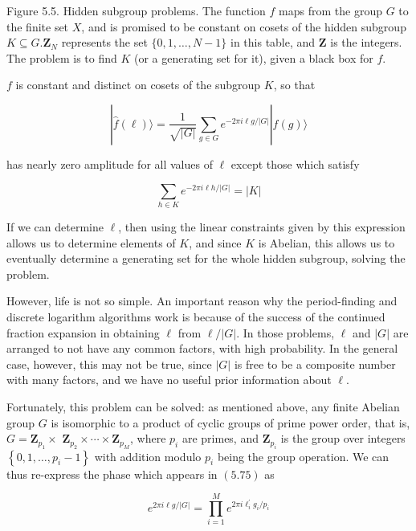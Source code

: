 Figure 5.5. Hidden subgroup problems. The function $f$ maps from the group $G$ to the finite set $X$, and is promised to be constant on cosets of the hidden subgroup $K \subseteq G . \mathbf{Z}_{N}$ represents the set $\{0,1, \ldots, N-1\}$ in this table, and $\mathbf{Z}$ is the integers. The problem is to find $K$ (or a generating set for it), given a black box for $f$.

$f$ is constant and distinct on cosets of the subgroup $K$, so that

\begin{equation}
    |\hat{f}(\ell)\rangle=\frac{1}{\sqrt{|G|}} \sum_{g \in G} e^{-2 \pi i \ell g /|G|}|f(g)\rangle \tag{5.76}
\end{equation}

has nearly zero amplitude for all values of $\ell$ except those which satisfy

\begin{equation}
    \sum_{h \in K} e^{-2 \pi i \ell h /|G|}=|K| \tag{5.77}
\end{equation}

If we can determine $\ell$, then using the linear constraints given by this expression allows us to determine elements of $K$, and since $K$ is Abelian, this allows us to eventually determine a generating set for the whole hidden subgroup, solving the problem.

However, life is not so simple. An important reason why the period-finding and discrete logarithm algorithms work is because of the success of the continued fraction expansion in obtaining $\ell$ from $\ell /|G|$. In those problems, $\ell$ and $|G|$ are arranged to not have any common factors, with high probability. In the general case, however, this may not be true, since $|G|$ is free to be a composite number with many factors, and we have no useful prior information about $\ell$.

Fortunately, this problem can be solved: as mentioned above, any finite Abelian group $G$ is isomorphic to a product of cyclic groups of prime power order, that is, $G=\mathbf{Z}_{p_{1}} \times$ $\mathbf{Z}_{p_{2}} \times \cdots \times \mathbf{Z}_{p_{M}}$, where $p_{i}$ are primes, and $\mathbf{Z}_{p_{i}}$ is the group over integers $\left\{0,1, \ldots, p_{i}-1\right\}$ with addition modulo $p_{i}$ being the group operation. We can thus re-express the phase which appears in $(5.75)$ as

\begin{equation}
    e^{2 \pi i \ell g /|G|}=\prod_{i=1}^{M} e^{2 \pi i \ell_{i}^{\prime} g_{i} / p_{i}} \tag{5.78}
\end{equation}

